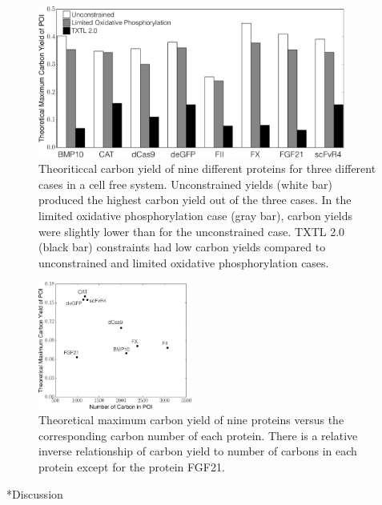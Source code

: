 \documentclass[12pt]{article}
\makeatletter
\renewcommand\section{\@startsection
	{subsection}{2}{0mm}
	{-0.2in}
	{0.05\baselineskip}
	{\normalfont\large\bfseries}}
\makeatother
\begin{document}
\begin{figure}[!t]\centering
\includegraphics[width=0.90\textwidth]{./figures/CarbonYield.pdf}
\caption{Theoriticcal carbon yield of nine different proteins for three different cases in a cell free system. 
Unconstrained yields (white bar) produced the highest carbon yield out of the three cases. In the limited oxidative phosphorylation case (gray bar), carbon yields were slightly lower than for the unconstrained case. TXTL 2.0 (black bar) constraints had low carbon yields compared to unconstrained and limited oxidative phosphorylation cases. 
}
\label{fig:CarbonYield}
\end{figure}

\begin{figure}[!t]\centering
\includegraphics[width=0.45\textwidth]{./figures/YieldNumber.pdf}
\caption{Theoretical maximum carbon yield of nine proteins versus the corresponding carbon number of each protein. There is a relative inverse relationship of carbon yield to number of carbons in each protein except for the protein FGF21. 
}
\label{fig:YieldNumber}
\end{figure}




\clearpage
\section*{Discussion}

\clearpage
\end{document}
